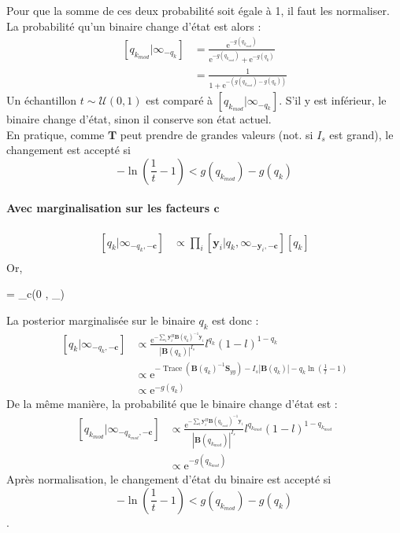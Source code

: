 \documentclass[ 12pt]{article}
\renewenvironment{equation}{\vspace{-0.2cm}\begin{oldequation}}{\vspace{-0.2cm}\end{oldequation}}
\newcommand{\e}{\mathrm{e}}
\begin{document}
Pour que la somme de ces deux probabilité soit égale à 1, il faut les normaliser. La probabilité qu'un binaire change d'état est alors : 
\begin{align*}
	\left[q_{k_{mod}} | \infty_{-q_k}  \right] & =  \frac{ \e^{- g(q_{k_{mod}})}}{ \e^{- g(q_{k_{mod}})} +\e^{- g(q_{k})}}  \\[1ex]
	&\boxed{= \frac{1}{1 + \e^{- \left(g(q_{k_{mod}}) -   g(q_{k})\right)}}}
\end{align*}
Un échantillon $t \sim \mathcal{U}(0,1)$ est comparé à $\left[q_{k_{mod}} | \infty_{-q_k}  \right]$. S'il y est inférieur, le binaire change d'état, sinon il conserve son état actuel.\\
En pratique, comme $\bm{T}$ peut prendre de grandes valeurs (not. si $I_s$ est grand), le changement est accepté si $$-\ln\left(\frac{1}{t}-1\right) < g(q_{k_{mod}}) -   g(q_{k})$$


\paragraph{Avec marginalisation sur les facteurs $\bm{c}$}

\begin{align*}
	\left[q_k | \infty	_{-q_k,-\bm{c}}  \right] &\propto \prod_i  \left[ \bm{y}_i |q_k, \infty_{-\bm{y}_i,-\bm{c}} \right] [q_k]\\
\end{align*}
Or, 
\begin{equation}
         = _c(0 , _{})
\end{equation}

La posterior marginalisée sur le binaire $q_k$ est donc : 
\begin{align*}
	\left[q_k | \infty	_{-q_k,-\bm{c}}  \right] &\propto \frac{\e^{ - \sum_i  \bm{y}_i^H \bm{B}(q_k)^{-1}\bm{y}_i  }}{|\bm{B}(q_k)|^{I_s}}  l^{q_k}(1-l)^{1-q_k}\\
	& \propto \e^{-\operatorname{Trace}\left( \bm{B}(q_k)^{-1}\bm{S}_{yy}\right) - I_s|\bm{B}(q_k)| - q_k \ln\left( \frac{1}{l}-1 \right)}\\
	& \propto \e^{- g(q_k)}
\end{align*}
De la même manière, la probabilité que le binaire change d'état est : 
\begin{align*}
	\left[q_{k_{mod}} | \infty	_{-q_{k_{mod}} ,-\bm{c}}  \right] & \propto  \frac{\e^{ - \sum_i  \bm{y}_i^H \bm{B}(q_{k_{mod}})^{-1}\bm{y}_i  }}{|\bm{B}(q_{k_{mod}})|^{I_s}}  l^{q_{k_{mod}}}(1-l)^{1-q_{k_{mod}}}\\
	 & \propto \e^{- g(q_{k_{mod}})}
\end{align*}
Après normalisation, le changement d'état du binaire est accepté si $$-\ln\left(\frac{1}{t}-1\right) < g(q_{k_{mod}}) -   g(q_{k})$$.
\end{document}
